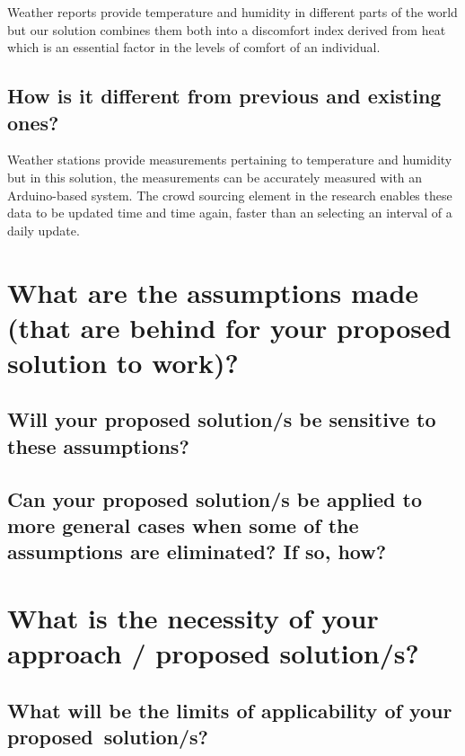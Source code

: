 Weather reports provide temperature and humidity in different parts of the world but our solution combines them both into a discomfort index derived from heat which is an essential factor in the levels of comfort of an individual.

\subsection{How is it different from previous and existing ones?}

Weather stations provide measurements pertaining to temperature and humidity but in this solution, the measurements can be accurately measured with an Arduino-based system. The crowd sourcing element in the research enables these data to be updated time and time again, faster than an selecting an interval of a daily update.
	
	
	
	
	
	
\section{What are the assumptions made (that are behind for your proposed solution to work)?}
	
\blindtext
		
	
\subsection{Will your proposed solution/s be sensitive to these assumptions?}
	
\blindtext

  
\subsection{Can your proposed solution/s be applied to more general cases when some of the assumptions are eliminated? If so, how?}

\blindtext






\section{What is the necessity of your approach / proposed solution/s?}

\blindtext
	
\subsection{What will be the limits of applicability of your proposed~solution/s?}


